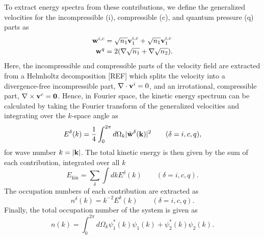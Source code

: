 To extract energy spectra from these contributions, we define the generalized
velocities for the incompressible (i), compressible (c), and quantum pressure
(q) parts as
\begin{equation}
    \begin{aligned}
        \vb{w}^{i, c} &= \sqrt{n_1}\vb{v}_1^{i, c} + \sqrt{n_1}\vb{v}_1^{i, c}
        \\
        \vb{w}^q &= 2 (\nabla \sqrt{n_1} + \nabla \sqrt{n_2}).
    \end{aligned}
\end{equation}
Here, the incompressible and compressible parts of the velocity field are
extracted from a Helmholtz decomposition [REF] which splits the velocity into a 
divergence-free incompressible part, $\nabla \cdot \vb{v}^i = 0$, and an 
irrotational, compressible part, $\nabla \times \vb{v}^c=\vb{0}$.
Hence, in Fourier space, the kinetic energy spectrum can be calculated by
taking the Fourier transform of the generalized velocities and integrating over
the $k$-space angle as
\begin{equation}
    E^\delta(k) = \frac{1}{4} \int_{0}^{2\pi} d\Omega_k
    |\tilde{\vb{w}}^\delta(\vb{k})|^2
    \qquad (\delta = i, c, q),
\end{equation}
for wave number $k=|\vb{k}|$.
The total kinetic energy is then given by the sum of each contribution,
integrated over all $k$
\begin{equation}
    E_\mathrm{kin} = \sum_\delta \int dk E^\delta (k) \qquad (\delta = i, c, q).
\end{equation}
The occupation numbers of each contribution are extracted as
\begin{equation}
    n^\delta(k) = k^{-2}E^\delta(k) \qquad (\delta = i, c, q).
\end{equation}
Finally, the total occupation number of the system is given as
\begin{equation}
    n(k) = \int_{0}^{2\pi} d\Omega_k \psi_1^*(k)\psi_1(k) 
    + \psi_2^*(k)\psi_2(k).
\end{equation}

